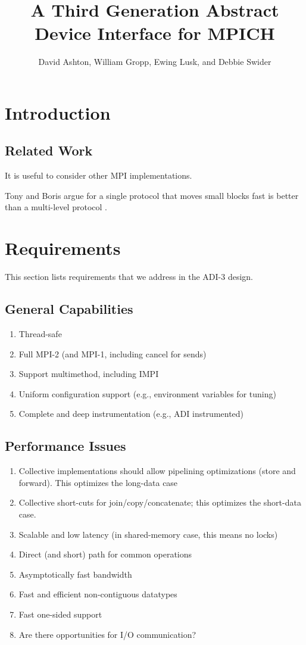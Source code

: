 \documentclass{article}
\begin{document}
\title{A Third Generation Abstract Device Interface for MPICH}
\author{David Ashton, William Gropp, Ewing Lusk, and Debbie Swider}
\maketitle

\section{Introduction}

\subsection{Related Work}
It is useful to consider other MPI implementations.

Tony and Boris argue for a single protocol that moves small blocks fast is
better than a multi-level protocol \cite{techreport}.

\section{Requirements}
This section lists requirements that we address in the ADI-3 design.

\subsection{General Capabilities}
\begin{enumerate}
\item Thread-safe
\item Full MPI-2 (and MPI-1, including cancel for sends)
\item Support multimethod, including IMPI
\item Uniform configuration support (e.g., environment variables for tuning)
\item Complete and deep instrumentation (e.g., ADI instrumented)
\end{enumerate}

\subsection{Performance Issues}
\begin{enumerate}
\item Collective implementations should allow pipelining optimizations (store
  and forward).  This optimizes the long-data case
\item Collective short-cuts for join/copy/concatenate; this optimizes the
  short-data case.
\item Scalable and low latency (in shared-memory case, this means no locks)
\item Direct (and short) path for common operations
\item Asymptotically fast bandwidth
\item Fast and efficient non-contiguous datatypes
\item Fast one-sided support
\item Are there opportunities for I/O communication?
\end{enumerate}
\end{document}
